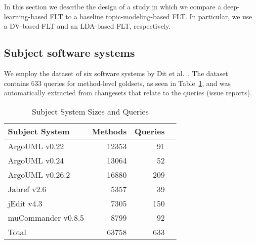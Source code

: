 
%


%


In this section we describe the design of a study in which we compare
a deep-learning-based FLT to a baseline topic-modeling-based FLT.  In
particular, we use a DV-based FLT and an LDA-based FLT, respectively.


\subsection{Subject software systems}

We employ the dataset of six software systems by Dit et
al.~\cite{Dit-etal_2013}.  The dataset contains 633 queries for method-level
goldsets, as seen in Table~\ref{table:subjects},  and was automatically
extracted from changesets that relate to the queries (issue reports).

\begin{table}[t]
\renewcommand{\arraystretch}{1.3}
\footnotesize
\centering
\caption{Subject System Sizes and Queries}
\begin{tabular}{lrrr}
    \toprule
    Subject System     & Methods & Queries    \\    %
    \midrule                                        %
    ArgoUML v0.22      & 12353    & 91        \\    %
    ArgoUML v0.24      & 13064    & 52        \\    %
    ArgoUML v0.26.2    & 16880    & 209       \\    %
    Jabref v2.6        & 5357     & 39        \\    %
    jEdit v4.3         & 7305     & 150       \\    %
    muCommander v0.8.5 & 8799     & 92        \\    %
    \midrule                                        %
    Total              & 63758    & 633       \\    %
    \bottomrule
\end{tabular}
\label{table:subjects}
\end{table}

